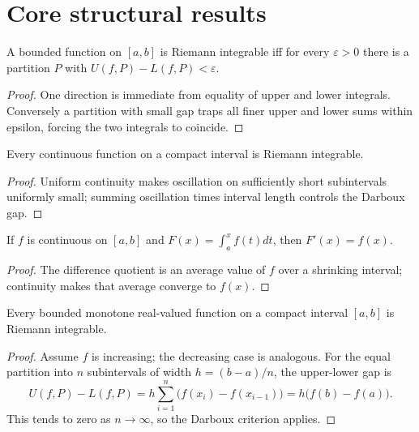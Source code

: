 \section{Core structural results}

\begin{theorem}\label{thm:ii10-01}
A bounded function on $[a,b]$ is Riemann integrable iff for every $\varepsilon>0$ there is a partition $P$ with $U(f,P)-L(f,P)<\varepsilon$.
\begin{proof}
One direction is immediate from equality of upper and lower integrals. Conversely a partition with small gap traps all finer upper and lower sums within epsilon, forcing the two integrals to coincide.
\end{proof}
\end{theorem}

\begin{theorem}\label{thm:ii10-02}
Every continuous function on a compact interval is Riemann integrable.
\begin{proof}
Uniform continuity makes oscillation on sufficiently short subintervals uniformly small; summing oscillation times interval length controls the Darboux gap.
\end{proof}
\end{theorem}

\begin{theorem}\label{thm:ii10-03}
If $f$ is continuous on $[a,b]$ and $F(x)=\int_a^x f(t)dt$, then $F'(x)=f(x)$.
\begin{proof}
The difference quotient is an average value of $f$ over a shrinking interval; continuity makes that average converge to $f(x)$.
\end{proof}
\end{theorem}

\begin{theorem}\label{thm:ii10-04}
Every bounded monotone real-valued function on a compact interval $[a,b]$ is Riemann integrable.
\begin{proof}
Assume $f$ is increasing; the decreasing case is analogous. For the equal partition into $n$ subintervals of width $h=(b-a)/n$, the upper-lower gap is
\[
U(f,P)-L(f,P)=h\sum_{i=1}^n\bigl(f(x_i)-f(x_{i-1})\bigr)
=h\bigl(f(b)-f(a)\bigr).
\]
This tends to zero as $n\to\infty$, so the Darboux criterion applies.
\end{proof}
\end{theorem}

